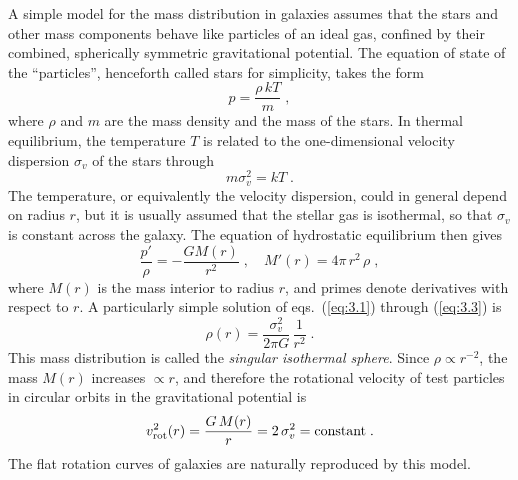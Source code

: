 \documentclass[a4paper,10pt]{article} %
\begin{document}
A simple model for the mass distribution in galaxies assumes that the
stars and other mass components behave like particles of an ideal gas,
confined by their combined, spherically symmetric gravitational
potential. The equation of state of the ``particles'', henceforth
called stars for simplicity, takes the form
\begin{equation}
  p = \frac{\rho\,kT}{m}\;,
\label{eq:3.1}
\end{equation}
where $\rho$ and $m$ are the mass density and the mass of the stars.
In thermal equilibrium, the temperature $T$ is related to the
one-dimensional velocity dispersion $\sigma_v$ of the stars through
\begin{equation}
  m\sigma_v^2 = kT\;.
\label{eq:3.2}
\end{equation}
The temperature, or equivalently the velocity dispersion, could in
general depend on radius $r$, but it is usually assumed that the
stellar gas is isothermal, so that $\sigma_v$ is constant across the
galaxy. The equation of hydrostatic equilibrium then gives
\begin{equation}
  \frac{p'}{\rho} = -\frac{GM(r)}{r^2}\;,\quad
  M'(r) = 4\pi\,r^2\,\rho\;,
\label{eq:3.3}
\end{equation}
where $M(r)$ is the mass interior to radius $r$, and primes denote
derivatives with respect to $r$. A particularly simple solution of
eqs.\ (\ref{eq:3.1}) through (\ref{eq:3.3}) is
\begin{equation}
  \rho(r) = \frac{\sigma_v^2}{2\pi G}\,\frac{1}{r^2}\;.
\label{eq:3.4}
\end{equation}
This mass distribution is called the {\em singular isothermal
sphere\/}. Since $\rho\propto r^{-2}$, the mass $M(r)$ increases
$\propto r$, and therefore the rotational velocity of test particles
in circular orbits in the gravitational potential is
\begin{equation}
  v_{\rm rot}^2(r) = \frac{G\,M(r)}{r} =
  2\,\sigma_v^2 = \hbox{constant}\;.
\label{eq:3.5}
\end{equation}
The flat rotation curves of galaxies are naturally reproduced by this
model.
\end{document}
